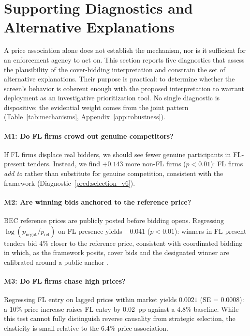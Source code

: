 \section{Supporting Diagnostics and Alternative Explanations}
\label{sec:mechanisms}

A price association alone does not establish the mechanism, nor is
it sufficient for an enforcement agency to act on. This section
reports five diagnostics that assess the plausibility of the
cover-bidding interpretation and constrain the set of alternative
explanations. Their purpose is practical: to determine whether the
screen's behavior is coherent enough with the proposed interpretation
to warrant deployment as an investigative prioritization tool. No
single diagnostic is dispositive; the evidential weight comes from
the joint pattern
(Table~\ref{tab:mechanisms}, Appendix~\ref{app:robustness}).

\paragraph{M1: Do FL firms crowd out genuine competitors?}
If FL firms displace real bidders, we should see fewer genuine
participants in FL-present tenders. Instead, we find $+0.143$ more
non-FL firms ($p < 0.01$): FL firms \emph{add to} rather than
substitute for genuine competition, consistent with the framework
(Diagnostic~\ref{pred:selection_v6}).

\paragraph{M2: Are winning bids anchored to the reference price?}
BEC reference prices are publicly posted before bidding opens.
Regressing $\log(p_{\text{negot}} / p_{\text{ref}})$ on FL presence
yields $-0.041$ ($p < 0.01$): winners in FL-present tenders bid 4\%
closer to the reference price, consistent with coordinated bidding in which, as the framework
posits, cover bids and the designated winner are calibrated around
a public anchor \citep{marshall2012economics}.

\paragraph{M3: Do FL firms chase high prices?}
Regressing FL entry on lagged prices within market yields $0.0021$
(SE = 0.0008): a 10\% price increase raises FL entry by 0.02~pp
against a 4.8\% baseline. While this test cannot fully distinguish
reverse causality from strategic selection, the elasticity is small
relative to the 6.4\% price association.

